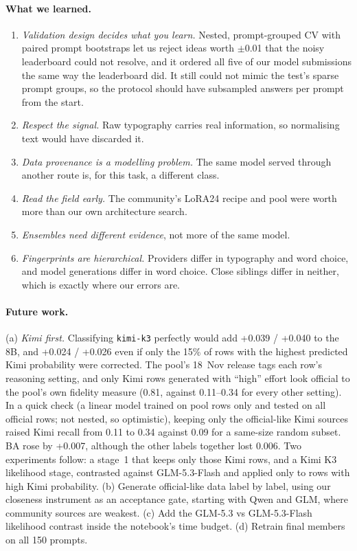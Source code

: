 \documentclass[10pt,twocolumn,letterpaper]{article}
\begin{document}
\paragraph{What we learned.}
\begin{enumerate}[label=(\roman*)]
\item \emph{Validation design decides what you learn.} Nested, prompt-grouped CV with paired prompt bootstraps let us reject ideas worth $\pm$0.01 that the noisy leaderboard could not resolve, and it ordered all five of our model submissions the same way the leaderboard did. It still could not mimic the test's sparse prompt groups, so the protocol should have subsampled answers per prompt from the start.
\item \emph{Respect the signal.} Raw typography carries real information, so normalising text would have discarded it.
\item \emph{Data provenance is a modelling problem.} The same model served through another route is, for this task, a different class.
\item \emph{Read the field early.} The community's LoRA24 recipe and pool were worth more than our own architecture search.
\item \emph{Ensembles need different evidence}, not more of the same model.
\item \emph{Fingerprints are hierarchical.} Providers differ in typography and word choice, and model generations differ in word choice. Close siblings differ in neither, which is exactly where our errors are.
\end{enumerate}

\paragraph{Future work.} (a) \emph{Kimi first.} Classifying \texttt{kimi-k3} perfectly would add +0.039 / +0.040 to the 8B, and +0.024 / +0.026 even if only the 15\% of rows with the highest predicted Kimi probability were corrected. The pool's 18~Nov release tags each row's reasoning setting, and only Kimi rows generated with ``high'' effort look official to the pool's own fidelity measure (0.81, against 0.11--0.34 for every other setting). In a quick check (a linear model trained on pool rows only and tested on all official rows; not nested, so optimistic), keeping only the official-like Kimi sources raised Kimi recall from 0.11 to 0.34 against 0.09 for a same-size random subset. BA rose by +0.007, although the other labels together lost 0.006. Two experiments follow: a stage~1 that keeps only those Kimi rows, and a Kimi K3 likelihood stage, contrasted against GLM-5.3-Flash and applied only to rows with high Kimi probability. (b) Generate official-like data label by label, using our closeness instrument as an acceptance gate, starting with Qwen and GLM, where community sources are weakest. (c) Add the GLM-5.3 vs GLM-5.3-Flash likelihood contrast inside the notebook's time budget. (d) Retrain final members on all 150 prompts.
\end{document}
